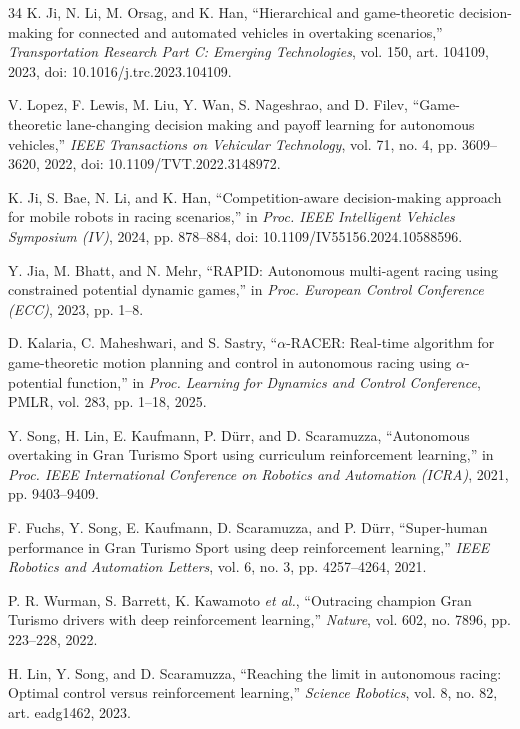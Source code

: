 \documentclass[journal,twoside,web]{ieeecolor}
\begin{document}
\begin{thebibliography}{34}
K. Ji, N. Li, M. Orsag, and K. Han,
``Hierarchical and game-theoretic decision-making for connected and automated
vehicles in overtaking scenarios,'' \emph{Transportation Research Part C:
Emerging Technologies}, vol. 150, art. 104109, 2023,
doi: 10.1016/j.trc.2023.104109.

V. Lopez, F. Lewis, M. Liu, Y. Wan, S. Nageshrao, and D. Filev,
``Game-theoretic lane-changing decision making and payoff learning for
autonomous vehicles,'' \emph{IEEE Transactions on Vehicular Technology},
vol. 71, no. 4, pp. 3609--3620, 2022,
doi: 10.1109/TVT.2022.3148972.

K. Ji, S. Bae, N. Li, and K. Han,
``Competition-aware decision-making approach for mobile robots in racing
scenarios,'' in \emph{Proc. IEEE Intelligent Vehicles Symposium (IV)}, 2024,
pp. 878--884, doi: 10.1109/IV55156.2024.10588596.

Y. Jia, M. Bhatt, and N. Mehr,
``RAPID: Autonomous multi-agent racing using constrained potential dynamic
games,'' in \emph{Proc. European Control Conference (ECC)}, 2023, pp. 1--8.

D. Kalaria, C. Maheshwari, and S. Sastry,
``$\alpha$-RACER: Real-time algorithm for game-theoretic motion planning and
control in autonomous racing using $\alpha$-potential function,'' in
\emph{Proc. Learning for Dynamics and Control Conference}, PMLR, vol. 283,
pp. 1--18, 2025.

Y. Song, H. Lin, E. Kaufmann, P. D\"urr, and D. Scaramuzza,
``Autonomous overtaking in Gran Turismo Sport using curriculum reinforcement
learning,'' in \emph{Proc. IEEE International Conference on Robotics and
Automation (ICRA)}, 2021, pp. 9403--9409.

F. Fuchs, Y. Song, E. Kaufmann, D. Scaramuzza, and P. D\"urr,
``Super-human performance in Gran Turismo Sport using deep reinforcement
learning,'' \emph{IEEE Robotics and Automation Letters}, vol. 6, no. 3,
pp. 4257--4264, 2021.

P. R. Wurman, S. Barrett, K. Kawamoto \emph{et al.},
``Outracing champion Gran Turismo drivers with deep reinforcement learning,''
\emph{Nature}, vol. 602, no. 7896, pp. 223--228, 2022.

H. Lin, Y. Song, and D. Scaramuzza,
``Reaching the limit in autonomous racing: Optimal control versus
reinforcement learning,'' \emph{Science Robotics}, vol. 8, no. 82,
art. eadg1462, 2023.


\end{thebibliography}
\end{document}

